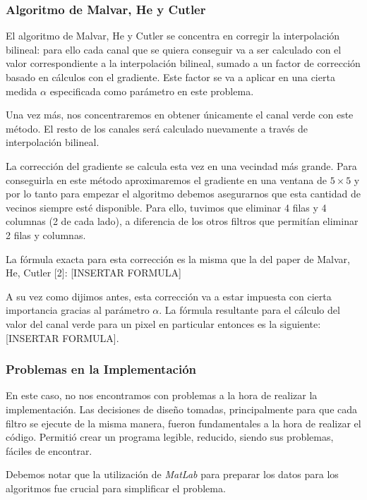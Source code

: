 \subsubsection{Algoritmo de Malvar, He y Cutler}

El algoritmo de Malvar, He y Cutler se concentra en corregir la interpolación bilineal: para ello cada canal que se quiera conseguir va a ser calculado con el valor correspondiente a la interpolación bilineal, sumado a un factor de corrección basado en cálculos con el gradiente. Este factor se va a aplicar en una cierta medida $\alpha$ especificada como parámetro en este problema.

Una vez más, nos concentraremos en obtener únicamente el canal verde con este método. El resto de los canales será calculado nuevamente a través de  interpolación bilineal.

La corrección del gradiente se calcula esta vez en una vecindad más grande. Para conseguirla en este método aproximaremos el gradiente en una ventana de $5 \times 5$  y por lo tanto para empezar el algoritmo debemos asegurarnos que esta cantidad de vecinos siempre esté disponible. Para ello, tuvimos que eliminar 4 filas y 4 columnas (2 de cada lado), a diferencia de los otros filtros que permitían eliminar 2 filas y columnas.

La fórmula exacta para esta corrección es la misma que la del paper de Malvar, He, Cutler [2]: [INSERTAR FORMULA]

A su vez como dijimos antes, esta corrección va a estar impuesta con cierta importancia gracias al parámetro $\alpha$. La fórmula resultante para el cálculo del valor del canal verde para un pixel en particular entonces es la siguiente: [INSERTAR FORMULA].




\subsubsection{Problemas en la Implementación}
En este caso, no nos encontramos con problemas a la hora de realizar la implementación. Las decisiones de diseño tomadas, principalmente para que cada filtro se ejecute de la misma manera, fueron fundamentales a la hora de realizar el código. Permitió crear un programa legible, reducido, siendo sus problemas, fáciles de encontrar.

Debemos notar que la utilización de \textit{MatLab} para preparar los datos para los algoritmos fue crucial para simplificar el problema.
	
